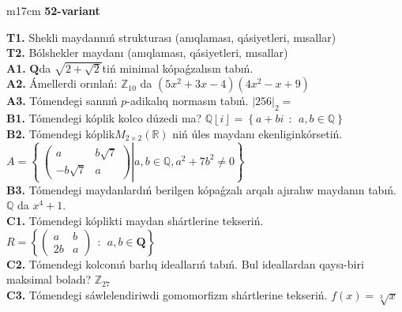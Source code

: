 \documentclass{article}
\begin{document}
\begin{tabular}{m{17cm}}
\textbf{52-variant}
\newline

\textbf{T1.} Shekli maydannıń strukturası (anıqlaması, qásiyetleri, mısallar) \\
\textbf{T2.} Bólshekler maydanı (anıqlaması, qásiyetleri, mısallar) \\
\textbf{A1.} \(\mathbf{Q}\)da \(\sqrt{2 + \sqrt{2}}\)tiń minimal kópaǵzalısın tabıń. \\
\textbf{A2.} Ámellerdi orınlań: \(\mathbb{Z}_{10}\) da \(\left( 5x^{2} + 3x - 4 \right)\left( 4x^{2} - x + 9 \right)\) \\
\textbf{A3.} Tómendegi sannıń \(p\)-adikalıq normasın tabıń. \(|256|_{2} =\) \\
\textbf{B1.} Tómendegi kóplik kolco dúzedi ma? \(\mathbb{Q}\left\lfloor i \right\rfloor = \left\{ a + bi\ \ :\ \ a,b\mathbb{\in Q} \right\}\) \\
\textbf{B2.} Tómendegi kóplik\(M_{2 \times 2}\left( \mathbb{R} \right)\) niń úles maydanı ekenliginkórsetiń. \(A = \left\{ \left. \ \begin{pmatrix}
a & b\sqrt{7} \\
 - b\sqrt{7} & a
\end{pmatrix} \right|a,b\mathbb{\in Q},a^{2} + 7b^{2} \neq 0 \right\}\) \\
\textbf{B3.} Tómendegi maydanlardıń berilgen kópaǵzalı arqalı ajıralıw maydanın tabıń. \(\mathbb{Q}\) da \(x^{4} + 1\). \\
\textbf{C1.} Tómendegi kóplikti maydan shártlerine tekseriń. \(R = \left\{ \begin{pmatrix}
a & b \\
2b & a
\end{pmatrix}\ \ :\ \ a,b \in \mathbf{Q} \right\}\) \\
\textbf{C2.} Tómendegi kolconıń barlıq ideallarıń tabıń. Bul ideallardan qaysı-biri maksimal boladı? \(\mathbb{Z}_{27}\) \\
\textbf{C3.} Tómendegi sáwlelendiriwdi gomomorfizm shártlerine tekseriń. \(f(x) = \sqrt[3]{x}\) \\

\end{tabular}
\vspace{1cm}
\end{document}

